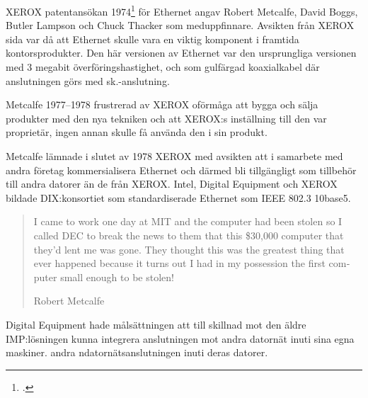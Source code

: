 \documentclass[swedish,10pt,a4paper]{report}
\begin{document}
XEROX patentansökan 1974\footcite[kap 6 sekt 7]{Pelkey} för Ethernet angav Robert Metcalfe, David Boggs, Butler Lampson och Chuck Thacker
som meduppfinnare. Avsikten från XEROX sida var då att Ethernet skulle vara en viktig komponent i
framtida kontorsprodukter.
Den här versionen av Ethernet var den ursprungliga versionen med 3 megabit överföringshastighet,
och som gulfärgad koaxialkabel där anslutningen görs med sk.\@vampyr-anslutning.

Metcalfe 1977--1978 frustrerad av XEROX oförmåga att bygga och sälja produkter
med den nya tekniken och att XEROX:s inställning till den var proprietär, ingen
annan skulle få använda den i sin produkt.

Metcalfe lämnade i slutet av 1978 XEROX med avsikten att i samarbete med andra
företag kommersialisera Ethernet
och därmed bli tillgängligt som tillbehör till andra datorer än de från
XEROX. Intel, Digital Equipment och XEROX bildade DIX:konsortiet som
standardiserade Ethernet som IEEE 802.3 10base5.

\foreignblockquote{english}[Robert Metcalfe]{I came to work one day at MIT and the computer had
  been stolen so I called DEC to break the news to them that this \$30,000
  computer that they'd lent me was gone. They thought this was the greatest thing that ever
  happened because it turns out I had in my possession the first computer small enough to be stolen!}

Digital Equipment hade målsättningen att till skillnad mot den äldre IMP:lösningen
kunna integrera anslutningen mot andra datornät inuti sina egna maskiner.
andra ndatornätsanslutningen inuti deras datorer.
\end{document}
